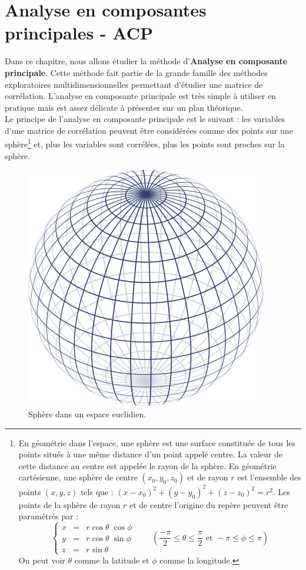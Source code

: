 \section{Analyse en composantes principales - ACP}

Dans ce chapitre, nous allons étudier la méthode d'\textbf{Analyse en composante principale}. Cette méthode fait partie de la grande famille des méthodes exploratoires multidimensionnelles permettant d'étudier une matrice de corrélation.\newline
L'analyse en composante principale est très simple à utiliser en pratique mais est assez délicate à présenter sur un plan théorique.\newline
\\
Le principe de l'analyse en composante principale est le suivant : les variables d'une matrice de corrélation peuvent être considérées comme des points sur une sphère\footnote{En géométrie dans l'espace, une sphère est une surface constituée de tous les points situés à une même distance d'un point appelé centre. La valeur de cette distance au centre est appelée le rayon de la sphère. En géométrie cartésienne, une sphère de centre $(x_{0},y_{0},z_{0})$ et de rayon $r$ est l'ensemble des points $(x,y,z)$ tels que : $(x-x_{0})^{2}+(y-y_{0})^{2}+(z-z_{0})^{2} = r^{2}$. Les points de la sphère de rayon $r$ et de centre l'origine du repère peuvent être paramétrés par :
$$\left\{
\begin{matrix}
x & = & r \cos\theta \; \cos\phi \\
y & = & r \cos\theta \; \sin\phi \\
z & = & r \sin\theta
\end{matrix}
\right.
\qquad\left(\frac{-\pi}{2} \le\theta\le \frac{\pi}{2} \textrm{ et } -\pi \le \phi \le \pi\right)$$
On peut voir $\theta$ comme la latitude et $\phi$ comme la longitude.} et, plus les variables sont corrélées, plus les points sont proches sur la sphère.\newline

\begin{figure}[H]\begin{center}\includegraphics[scale=0.35]{ilu/sphere.png}\caption{Sphère dans un espace euclidien.}\end{center}\end{figure}

